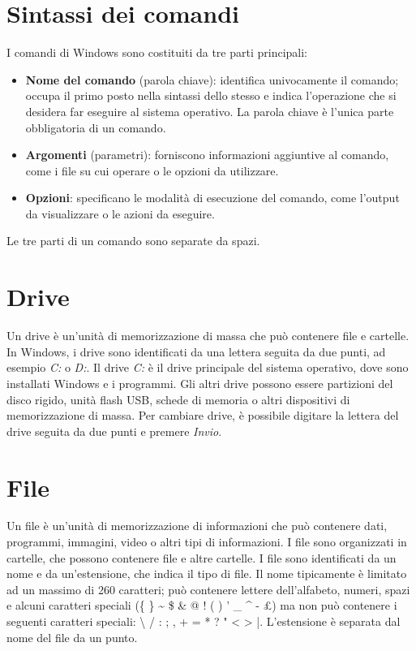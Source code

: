 \documentclass[12pt]{report}
\begin{document}
	\section{Sintassi dei comandi}
	I comandi di Windows sono costituiti da tre parti principali:
	\begin{itemize}
		\item \textbf{Nome del comando} (parola chiave): identifica univocamente il comando; occupa il primo posto nella sintassi dello stesso e indica l’operazione che si desidera far eseguire al sistema operativo. La parola chiave è l’unica parte obbligatoria di un comando.
		\item \textbf{Argomenti} (parametri): forniscono informazioni aggiuntive al comando, come i file su cui operare o le opzioni da utilizzare.
		\item \textbf{Opzioni}: specificano le modalità di esecuzione del comando, come l'output da visualizzare o le azioni da eseguire.
	\end{itemize}
	Le tre parti di un comando sono separate da spazi.

	\section{Drive}
	Un drive è un'unità di memorizzazione di massa che può contenere file e cartelle. In Windows, i drive sono identificati da una lettera seguita da due punti, ad esempio \textit{C:} o \textit{D:}. Il drive \textit{C:} è il drive principale del sistema operativo, dove sono installati Windows e i programmi. Gli altri drive possono essere partizioni del disco rigido, unità flash USB, schede di memoria o altri dispositivi di memorizzazione di massa. Per cambiare drive, è possibile digitare la lettera del drive seguita da due punti e premere \textit{Invio}.

	\section{File}
	Un file è un'unità di memorizzazione di informazioni che può contenere dati, programmi, immagini, video o altri tipi di informazioni. I file sono organizzati in cartelle, che possono contenere file e altre cartelle. I file sono identificati da un nome e da un'estensione, che indica il tipo di file. Il nome tipicamente è limitato ad un massimo di 260 caratteri; può contenere lettere dell'alfabeto, numeri, spazi e alcuni caratteri speciali (\{ \} \textasciitilde{} \$ \& @ ! ( ) ' \_ \^{} - £) ma non può contenere i seguenti caratteri speciali: \textbackslash{} / : ; , + = * ? " < > |. L'estensione è separata dal nome del file da un punto.
\end{document}
